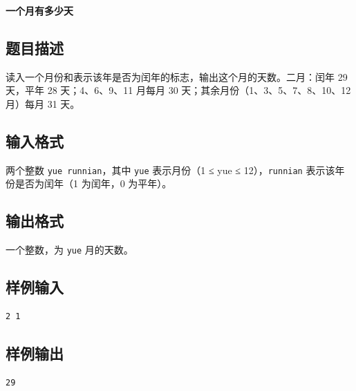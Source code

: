 \documentclass{article}
\newcommand{\problemname}[1]{\begin{center}\Large\bfseries #1\end{center}}
\begin{document}
\problemname{一个月有多少天}

\subsection*{题目描述}
读入一个月份和表示该年是否为闰年的标志，输出这个月的天数。二月：闰年 29 天，平年 28 天；4、6、9、11 月每月 30 天；其余月份（1、3、5、7、8、10、12 月）每月 31 天。

\subsection*{输入格式}
两个整数 \texttt{yue runnian}，其中 \texttt{yue} 表示月份（1 ≤ yue ≤ 12），\texttt{runnian} 表示该年份是否为闰年（1 为闰年，0 为平年）。

\subsection*{输出格式}
一个整数，为 \texttt{yue} 月的天数。

\subsection*{样例输入}
\begin{verbatim}
2 1
\end{verbatim}

\subsection*{样例输出}
\begin{verbatim}
29
\end{verbatim}
\end{document}
